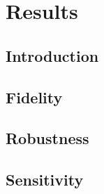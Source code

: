 \section{Results}

\subsection{Introduction}

\subsection{Fidelity}

\subsection{Robustness}

\subsection{Sensitivity}

